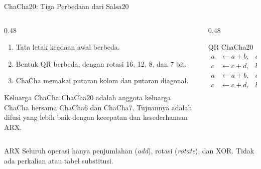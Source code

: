 \documentclass[aspectratio=169,11pt]{beamer}
\begin{document}
\begin{frame}{ChaCha20: Tiga Perbedaan dari Salsa20}
    \footnotesize
    \begin{columns}[T,onlytextwidth]
        \begin{column}{0.48\textwidth}
            \begin{enumerate}
                \item Tata letak keadaan awal berbeda.
                \item Bentuk QR berbeda, dengan rotasi 16, 12, 8, dan 7 bit.
                \item ChaCha memakai putaran kolom dan putaran diagonal.
            \end{enumerate}
            \vspace{0.1cm}
            \begin{block}{Keluarga ChaCha}
                ChaCha20 adalah anggota keluarga ChaCha bersama ChaCha6 dan
                ChaCha7. Tujuannya adalah difusi yang lebih baik dengan
                kecepatan dan kesederhanaan ARX.
            \end{block}
        \end{column}
        \begin{column}{0.48\textwidth}
            \begin{block}{QR ChaCha20}
                \scriptsize
                \begin{align*}
                    a&\leftarrow a+b, &
                    d&\leftarrow d\oplus a, &
                    d&\leftarrow d\lll 16,\\
                    c&\leftarrow c+d, &
                    b&\leftarrow b\oplus c, &
                    b&\leftarrow b\lll 12,\\
                    a&\leftarrow a+b, &
                    d&\leftarrow d\oplus a, &
                    d&\leftarrow d\lll 8,\\
                    c&\leftarrow c+d, &
                    b&\leftarrow b\oplus c, &
                    b&\leftarrow b\lll 7.
                \end{align*}
            \end{block}
        \end{column}
    \end{columns}
    \vspace{0.1cm}
    \begin{exampleblock}{ARX}
        Seluruh operasi hanya penjumlahan (\textit{add}), rotasi
        (\textit{rotate}), dan XOR. Tidak ada perkalian atau tabel
        substitusi.
    \end{exampleblock}
\end{frame}
\end{document}
